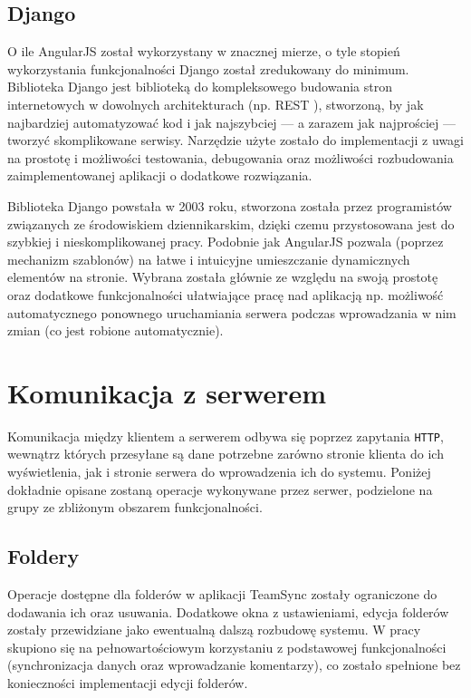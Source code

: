 \documentclass[polish,a4paper,twoside]{ppfcmthesis}
\begin{document}
\subsection*{Django}

O ile AngularJS został wykorzystany w znacznej mierze, o tyle stopień wykorzystania funkcjonalności Django został zredukowany do minimum. Biblioteka Django jest biblioteką do kompleksowego budowania stron internetowych w dowolnych architekturach (np. REST \cite{rest}), stworzoną, by jak najbardziej automatyzować kod i jak najszybciej --- a zarazem jak najprościej --- tworzyć skomplikowane serwisy. Narzędzie użyte zostało do implementacji z uwagi na prostotę i możliwości testowania, debugowania oraz możliwości rozbudowania zaimplementowanej aplikacji o dodatkowe rozwiązania.

Biblioteka Django powstała w 2003 roku, stworzona została przez programistów związanych ze środowiskiem dziennikarskim, dzięki czemu przystosowana jest do szybkiej i nieskomplikowanej pracy. Podobnie jak AngularJS pozwala (poprzez mechanizm szablonów) na łatwe i intuicyjne umieszczanie dynamicznych elementów na stronie. Wybrana została głównie ze względu na swoją prostotę oraz dodatkowe funkcjonalności ułatwiające pracę nad aplikacją np. możliwość automatycznego ponownego uruchamiania serwera podczas wprowadzania w nim zmian (co jest robione automatycznie).

\section{Komunikacja z serwerem}

Komunikacja między klientem a serwerem odbywa się poprzez zapytania \texttt{HTTP}, wewnątrz których przesyłane są dane potrzebne zarówno stronie klienta do ich wyświetlenia, jak i stronie serwera do wprowadzenia ich do systemu. Poniżej dokładnie opisane zostaną operacje wykonywane przez serwer, podzielone na grupy ze zbliżonym obszarem funkcjonalności.

\subsection{Foldery}

Operacje dostępne dla folderów w aplikacji TeamSync zostały ograniczone do dodawania ich oraz usuwania. Dodatkowe okna z ustawieniami, edycja folderów zostały przewidziane jako ewentualną dalszą rozbudowę systemu. W pracy skupiono się na pełnowartościowym korzystaniu z podstawowej funkcjonalności (synchronizacja danych oraz wprowadzanie komentarzy), co zostało spełnione bez konieczności implementacji edycji folderów.
\end{document}
